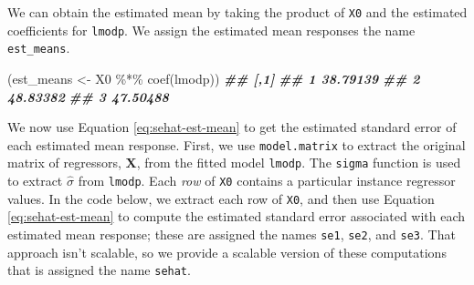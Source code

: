 \documentclass[
]{book}
\newenvironment{Shaded}{\begin{snugshade}}{\end{snugshade}}
\newcommand{\AttributeTok}[1]{\textcolor[rgb]{0.77,0.63,0.00}{#1}}
\newcommand{\CommentTok}[1]{\textcolor[rgb]{0.56,0.35,0.01}{\textit{#1}}}
\newcommand{\DocumentationTok}[1]{\textcolor[rgb]{0.56,0.35,0.01}{\textbf{\textit{#1}}}}
\newcommand{\FunctionTok}[1]{\textcolor[rgb]{0.00,0.00,0.00}{#1}}
\newcommand{\NormalTok}[1]{#1}
\newcommand{\OtherTok}[1]{\textcolor[rgb]{0.56,0.35,0.01}{#1}}
\newcommand{\SpecialCharTok}[1]{\textcolor[rgb]{0.00,0.00,0.00}{#1}}
\theoremstyle{definition}
\theoremstyle{definition}
\theoremstyle{definition}
\theoremstyle{definition}
\theoremstyle{remark}
\begin{document}
\begin{Shaded}
\end{Shaded}

We can obtain the estimated mean by taking the product of \texttt{X0} and the estimated coefficients for \texttt{lmodp}. We assign the estimated mean responses the name \texttt{est\_means}.

\begin{Shaded}
\begin{Highlighting}[]
\NormalTok{(est\_means }\OtherTok{\textless{}{-}}\NormalTok{ X0 }\SpecialCharTok{\%*\%} \FunctionTok{coef}\NormalTok{(lmodp))}
\DocumentationTok{\#\#       [,1]}
\DocumentationTok{\#\# 1 38.79139}
\DocumentationTok{\#\# 2 48.83382}
\DocumentationTok{\#\# 3 47.50488}
\end{Highlighting}
\end{Shaded}

We now use Equation \eqref{eq:sehat-est-mean} to get the estimated standard error of each estimated mean response. First, we use \texttt{model.matrix} to extract the original matrix of regressors, \(\mathbf{X}\), from the fitted model \texttt{lmodp}. The \texttt{sigma} function is used to extract \(\hat{\sigma}\) from \texttt{lmodp}. Each \emph{row} of \texttt{X0} contains a particular instance regressor values. In the code below, we extract each row of \texttt{X0}, and then use Equation \eqref{eq:sehat-est-mean} to compute the estimated standard error associated with each estimated mean response; these are assigned the names \texttt{se1}, \texttt{se2}, and \texttt{se3}. That approach isn't scalable, so we provide a scalable version of these computations that is assigned the name \texttt{sehat}.
\end{document}
